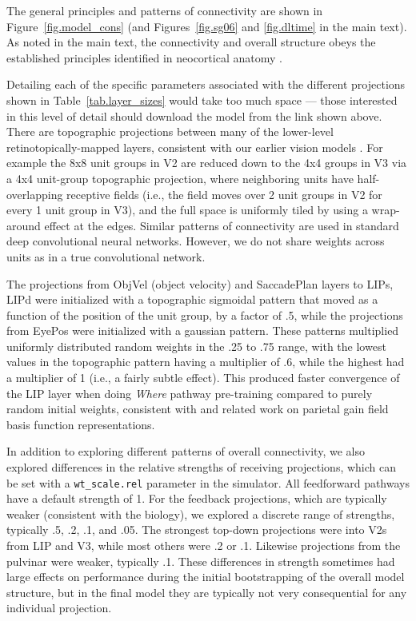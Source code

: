 The general principles and patterns of connectivity are shown in Figure~\ref{fig.model_cons} (and Figures~\ref{fig.sg06} and \ref{fig.dltime} in the main text).  As noted in the main text, the connectivity and overall structure obeys the established principles identified in neocortical anatomy \citep{RocklandPandya79,FellemanVanEssen91,MarkovVezoliChameauEtAl14,MarkovErcsey-RavaszGomesEtAl14}.

Detailing each of the specific parameters associated with the different projections shown in Table~\ref{tab.layer_sizes} would take too much space --- those interested in this level of detail should download the model from the link shown above.  There are topographic projections between many of the lower-level retinotopically-mapped layers, consistent with our earlier vision models \citep{OReillyWyatteHerdEtAl13}.  For example the 8x8 unit groups in V2 are reduced down to the 4x4 groups in V3 via a 4x4 unit-group topographic projection, where neighboring units have half-overlapping receptive fields (i.e., the field moves over 2 unit groups in V2 for every 1 unit group in V3), and the full space is uniformly tiled by using a wrap-around effect at the edges.  Similar patterns of connectivity are used in standard deep convolutional neural networks.  However, we do not share weights across units as in a true convolutional network.

The projections from ObjVel (object velocity) and SaccadePlan layers to LIPs, LIPd were initialized with a topographic sigmoidal pattern that moved as a function of the position of the unit group, by a factor of .5, while the projections from EyePos were initialized with a gaussian pattern.  These patterns multiplied uniformly distributed random weights in the .25 to .75 range, with the lowest values in the topographic pattern having a multiplier of .6, while the highest had a multiplier of 1 (i.e., a fairly subtle effect).  This produced faster convergence of the LIP layer when doing {\em Where} pathway pre-training compared to purely random initial weights, consistent with \citet{PougetSejnowski97a} and related work on parietal gain field basis function representations.

In addition to exploring different patterns of overall connectivity, we also explored differences in the relative strengths of receiving projections, which can be set with a \texttt{wt\_scale.rel} parameter in the simulator.  All feedforward pathways have a default strength of 1.  For the feedback projections, which are typically weaker (consistent with the biology), we explored a discrete range of strengths, typically .5, .2, .1, and .05.  The strongest top-down projections were into V2s from LIP and V3, while most others were .2 or .1.  Likewise projections from the pulvinar were weaker, typically .1.  These differences in strength sometimes had large effects on performance during the initial bootstrapping of the overall model structure, but in the final model they are typically not very consequential for any individual projection.

